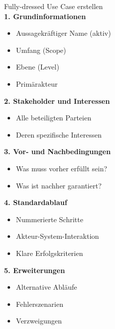 \begin{KR}{Fully-dressed Use Case erstellen}\\
\textbf{1. Grundinformationen}
\begin{itemize}
    \item Aussagekräftiger Name (aktiv)
    \item Umfang (Scope)
    \item Ebene (Level)
    \item Primärakteur
\end{itemize}

\textbf{2. Stakeholder und Interessen}
\begin{itemize}
    \item Alle beteiligten Parteien
    \item Deren spezifische Interessen
\end{itemize}

\textbf{3. Vor- und Nachbedingungen}
\begin{itemize}
    \item Was muss vorher erfüllt sein?
    \item Was ist nachher garantiert?
\end{itemize}

\textbf{4. Standardablauf}
\begin{itemize}
    \item Nummerierte Schritte
    \item Akteur-System-Interaktion
    \item Klare Erfolgskriterien
\end{itemize}

\textbf{5. Erweiterungen}
\begin{itemize}
    \item Alternative Abläufe
    \item Fehlerszenarien
    \item Verzweigungen
\end{itemize}
\end{KR}

